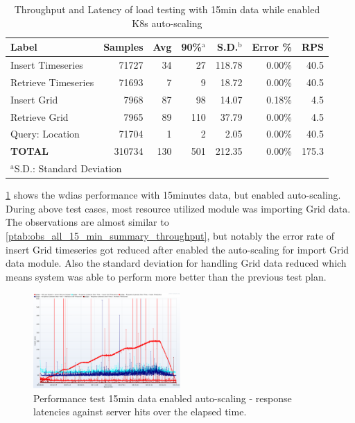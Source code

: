 \documentclass[conference]{IEEEtran}
\begin{document}
\begin{table}[htbp]
\caption{Throughput and Latency of load testing with 15min data while enabled K8s auto-scaling}
\begin{center}
\begin{adjustbox}{width=0.45\textwidth}
\footnotesize
\begin{tabular}{|l|r|r|r|r|r|r|}
\hline
\textbf{Label} & \textbf{Samples} & \textbf{Avg} & \textbf{90\%$^{\mathrm{a}}$} & \textbf{S.D.$^{\mathrm{b}}$} & \textbf{Error \%} & \textbf{RPS} \\ \hline
Insert Timeseries & 71727 & 34 & 27 & 118.78 & 0.00\% & 40.5 \\ \hline
Retrieve Timeseries & 71693 & 7 & 9 & 18.72 & 0.00\% & 40.5 \\ \hline
Insert Grid & 7968 & 87 & 98 & 14.07 & 0.18\% & 4.5 \\ \hline
Retrieve Grid & 7965 & 89 & 110 & 37.79 & 0.00\% & 4.5 \\ \hline
Query: Location & 71704 & 1 & 2 & 2.05 & 0.00\% & 40.5 \\ \hline
\textbf{TOTAL} & 310734 & 130 & 501 & 212.35 & 0.00\% & 175.3 \\ \hline
\multicolumn{4}{l}{$^{\mathrm{a}}$S.D.: Standard Deviation}{$^{\mathrm{b}}$90\%: 90\% percentile}
\end{tabular}
\end{adjustbox}
\label{ptab:obs_all_auto_15_min_summary_throughput}
\end{center}
\end{table}

\cref{ptab:obs_all_auto_15_min_summary_throughput} shows the \acrshort{wdias} performance with 15minutes data, but enabled auto-scaling. During above test cases, most resource utilized module was importing Grid data.
The observations are almost similar to \cref{ptab:obs_all_15_min_summary_throughput}, but notably the error rate of insert Grid timeseries got reduced after enabled the auto-scaling for import Grid data module. Also the standard deviation for handling Grid data reduced which means system was able to perform more better than the previous test plan.

\begin{figure}[htbp]
\centerline{\includegraphics[width=0.5\textwidth]{results/obs/all_auto/obs_all_auto_15m_res_latencies_against_hits.png}}
\caption{Performance test 15min data enabled auto-scaling - response latencies against server hits over the elapsed time.}
\label{pfi:test_obs_auto_all_15_min_latency_vs_hits}
\end{figure}
\end{document}
